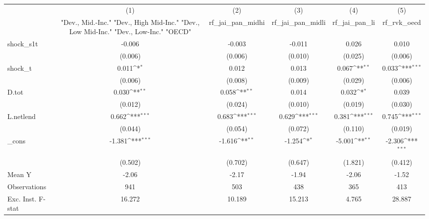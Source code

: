 {
\def\sym#1{\ifmmode^{#1}\else\(^{#1}\)\fi}
\begin{tabular}{l*{5}{c}}
\toprule
            &\multicolumn{1}{c}{(1)}&\multicolumn{1}{c}{(2)}&\multicolumn{1}{c}{(3)}&\multicolumn{1}{c}{(4)}&\multicolumn{1}{c}{(5)}\\
            &\multicolumn{1}{c}{ "Dev., Mid.-Inc." "Dev., High Mid-Inc." "Dev., Low Mid-Inc." "Dev., Low-Inc." "OECD" }&\multicolumn{1}{c}{rf\_jai\_pan\_midhi}&\multicolumn{1}{c}{rf\_jai\_pan\_midli}&\multicolumn{1}{c}{rf\_jai\_pan\_li}&\multicolumn{1}{c}{rf\_rvk\_oecd}\\
\midrule
shock\_s1t   &      -0.006         &      -0.003         &      -0.011         &       0.026         &       0.010         \\
            &     (0.006)         &     (0.006)         &     (0.010)         &     (0.025)         &     (0.006)         \\
\addlinespace
shock\_t     &       0.011\sym{*}  &       0.012         &       0.013         &       0.067\sym{**} &       0.033\sym{***}\\
            &     (0.006)         &     (0.008)         &     (0.009)         &     (0.029)         &     (0.006)         \\
\addlinespace
D.tot       &       0.030\sym{**} &       0.058\sym{**} &       0.014         &       0.032\sym{*}  &       0.039         \\
            &     (0.012)         &     (0.024)         &     (0.010)         &     (0.019)         &     (0.030)         \\
\addlinespace
L.netlend   &       0.662\sym{***}&       0.683\sym{***}&       0.629\sym{***}&       0.381\sym{***}&       0.745\sym{***}\\
            &     (0.044)         &     (0.054)         &     (0.072)         &     (0.110)         &     (0.019)         \\
\addlinespace
\_cons      &      -1.381\sym{***}&      -1.616\sym{**} &      -1.254\sym{*}  &      -5.001\sym{**} &      -2.306\sym{***}\\
            &     (0.502)         &     (0.702)         &     (0.647)         &     (1.821)         &     (0.412)         \\
\midrule
Mean Y      &       -2.06         &       -2.17         &       -1.94         &       -2.06         &       -1.52         \\
Observations&         941         &         503         &         438         &         365         &         413         \\
Exc. Inst. F-stat&      16.272         &      10.189         &      15.213         &       4.765         &      28.887         \\
\bottomrule
\end{tabular}
}
